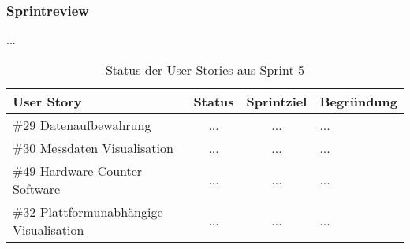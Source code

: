 \subsubsection*{Sprintreview}
...
\begin{table}[H]
    \centering
    \begin{tabular}{p{4cm}ccp{7cm}}
        \textbf{User Story} &  \textbf{Status} & \textbf{Sprintziel}& \textbf{Begründung}\\\toprule[2pt]
        \#29 Datenaufbewahrung & ... & ... & ...\\
        \#30 Messdaten Visualisation & ... & ... & ...\\
        \#49 Hardware Counter Software & ... & ... & ...\\
        \#32 Plattformunabhängige Visualisation & ... & ... & ...\\
    \end{tabular}
    \caption{Status der User Stories aus Sprint 5}
\end{table}